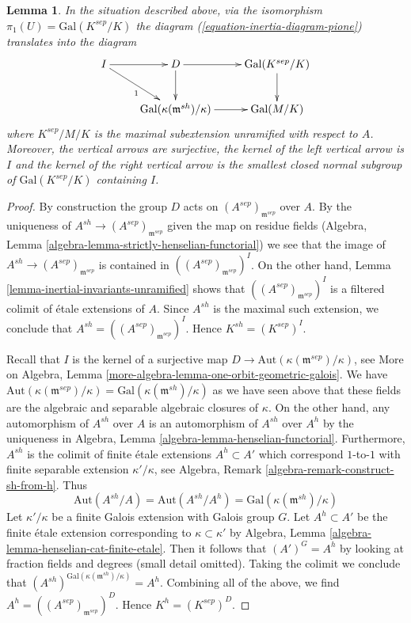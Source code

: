 \documentclass{stacks-project}
\theoremstyle{plain}
\newtheorem{lemma}[subsection]{Lemma}
\theoremstyle{definition}
\theoremstyle{remark}
\numberwithin{equation}{subsection}
\begin{document}
\begin{lemma}
\label{lemma-identify-inertia}
In the situation described above, via the isomorphism
$\pi_1(U) = \text{Gal}(K^{sep}/K)$ the diagram
(\ref{equation-inertia-diagram-pione})
translates into the diagram
$$
\xymatrix{
I \ar[r] \ar[rd]_1 & D \ar[d] \ar[r] & \text{Gal}(K^{sep}/K) \ar[d] \\
& \text{Gal}(\kappa(\mathfrak m^{sh})/\kappa) \ar[r] & \text{Gal}(M/K)
}
$$
where $K^{sep}/M/K$ is the maximal subextension unramified
with respect to $A$. Moreover, the vertical arrows are surjective,
the kernel of the left vertical arrow is $I$ and the kernel of the
right vertical arrow is
the smallest closed normal subgroup of $\text{Gal}(K^{sep}/K)$
containing $I$.
\end{lemma}

\begin{proof}
By construction the group $D$ acts on $(A^{sep})_{\mathfrak m^{sep}}$
over $A$. By the uniqueness of $A^{sh} \to (A^{sep})_{\mathfrak m^{sep}}$
given the map on residue fields
(Algebra, Lemma \ref{algebra-lemma-strictly-henselian-functorial})
we see that the image of $A^{sh} \to (A^{sep})_{\mathfrak m^{sep}}$
is contained in $((A^{sep})_{\mathfrak m^{sep}})^I$.
On the other hand,
Lemma \ref{lemma-inertial-invariants-unramified}
shows that $((A^{sep})_{\mathfrak m^{sep}})^I$
is a filtered colimit of \'etale extensions of $A$.
Since $A^{sh}$ is the maximal such extension, we conclude
that $A^{sh} = ((A^{sep})_{\mathfrak m^{sep}})^I$.
Hence $K^{sh} = (K^{sep})^I$.

\medskip\noindent
Recall that $I$ is the kernel of a surjective map
$D \to \text{Aut}(\kappa(\mathfrak m^{sep})/\kappa)$, see
More on Algebra, Lemma \ref{more-algebra-lemma-one-orbit-geometric-galois}.
We have $\text{Aut}(\kappa(\mathfrak m^{sep})/\kappa) =
\text{Gal}(\kappa(\mathfrak m^{sh})/\kappa)$
as we have seen above that these fields are the algebraic
and separable algebraic closures of $\kappa$.
On the other hand, any automorphism of $A^{sh}$ over $A$
is an automorphism of $A^{sh}$ over $A^h$ by the uniqueness
in Algebra, Lemma \ref{algebra-lemma-henselian-functorial}.
Furthermore, $A^{sh}$ is the colimit of finite \'etale
extensions $A^h \subset A'$ which correspond $1$-to-$1$
with finite separable extension $\kappa'/\kappa$, see
Algebra, Remark \ref{algebra-remark-construct-sh-from-h}.
Thus
$$
\text{Aut}(A^{sh}/A) = \text{Aut}(A^{sh}/A^h) =
\text{Gal}(\kappa(\mathfrak m^{sh})/\kappa)
$$
Let $\kappa'/\kappa$ be a finite Galois extension with
Galois group $G$. Let $A^h \subset A'$ be the finite \'etale extension
corresponding to $\kappa \subset \kappa'$ by
Algebra, Lemma \ref{algebra-lemma-henselian-cat-finite-etale}.
Then it follows that
$(A')^G = A^h$ by looking at fraction fields and degrees
(small detail omitted). Taking the colimit we conclude that
$(A^{sh})^{\text{Gal}(\kappa(\mathfrak m^{sh})/\kappa)} = A^h$.
Combining all of the above, we find $A^h = ((A^{sep})_{\mathfrak m^{sep}})^D$.
Hence $K^h = (K^{sep})^D$.


\end{proof}
\end{document}
